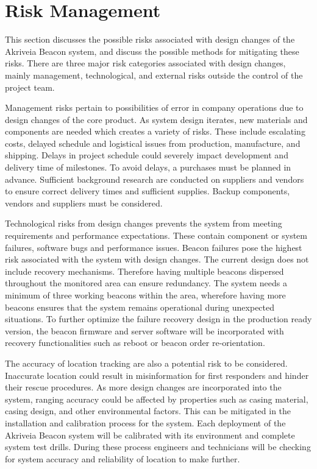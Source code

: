 

\setcounter{section}{3}
\section{Risk Management}
\medskip
This section discusses the possible risks associated with design changes of the Akriveia Beacon system, and discuss the possible methods for mitigating these risks. There are three major risk categories associated with design changes, mainly management, technological, and external risks outside the control of the project team.

\bigskip
Management risks pertain to possibilities of error in company operations due to design changes of the core product. As system design iterates, new materials and components are needed which creates a variety of risks. These include escalating costs, delayed schedule and logistical issues from production, manufacture, and shipping. Delays in project schedule could severely impact development and delivery time of milestones. To avoid delays, a purchases must be planned in advance. Sufficient background research are conducted on suppliers and vendors to ensure correct delivery times and sufficient supplies. Backup components, vendors and suppliers must be considered.

\bigskip
Technological risks from design changes prevents the system from meeting requirements and performance expectations. These contain component or system failures, software bugs and performance issues. Beacon failures pose the highest risk associated with the system with design changes. The current design does not include recovery mechanisms. Therefore having multiple beacons dispersed throughout the monitored area can ensure redundancy. The system needs a minimum of three working beacons within the area, wherefore having more beacons ensures that the system remains operational during unexpected situations. To further optimize the failure recovery design in the production ready version, the beacon firmware and server software will be incorporated with recovery functionalities such as reboot or beacon order re-orientation. 

\bigskip
The accuracy of location tracking are also a potential risk to be considered. Inaccurate location could result in misinformation for first responders and hinder their rescue procedures. As more design changes are incorporated into the system, ranging accuracy could be affected by properties such as casing material, casing design, and other environmental factors. This can be mitigated in the installation and calibration process for the system. Each deployment of the Akriveia Beacon system will be calibrated with its environment and complete system test drills. During these process engineers and technicians will be checking for system accuracy and reliability of location to make further. 

